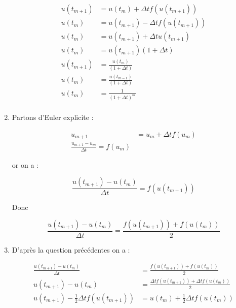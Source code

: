\documentclass[12pt, letterpaper]{article}
\begin{document}
\begin{enumerate}
  \begin{equation*}
    \begin{split}
      u(t_{m+1}) & = u(t_m) + \Delta t f(u(t_{m+1})) \\
      u(t_m) & = u(t_{m+1}) - \Delta t f(u(t_{m+1})) \\
      u(t_m) & = u(t_{m+1}) + \Delta t u(t_{m+1}) \\
      u(t_m) & = u(t_{m+1}) (1 + \Delta t) \\
      u(t_{m+1}) & = \frac{u(t_m)}{(1 + \Delta t)} \\
      u(t_m) & = \frac{u(t_{m-1})}{(1 + \Delta t)} \\
      u(t_m) & = \frac{1}{(1 + \Delta t)^m} \\
    \end{split}
  \end{equation*}


\item
  Partons d'Euler explicite :

  \begin{equation*}
    \begin{split}
      u_{m+1} & = u_m + \Delta t f(u_m) \\
      \frac{u_{m+1} - u_m}{\Delta t} = f(u_m)
    \end{split}
  \end{equation*}

  or on a :

  \begin{equation*}
    \frac{u(t_{m + 1}) - u(t_m)}{\Delta t} = f(u(t_{m+1}))
  \end{equation*}

  Donc

  \begin{equation*}
    \frac{u(t_{m + 1}) - u(t_m)}{\Delta t} = \frac{f(u(t_{m+1})) + f(u(t_m))}{2}
  \end{equation*}

    
\item

  D'après la question précédentes on a :

  \begin{equation*}
    \begin{split}
      \frac{u(t_{m + 1}) - u(t_m)}{\Delta t} & = \frac{f(u(t_{m+1})) +
        f(u(t_m))}{2} \\
      u(t_{m + 1}) - u(t_m) & = \frac{\Delta t f(u(t_{m+1})) +
        \Delta t f(u(t_m))}{2} \\
      u(t_{m + 1}) - \frac{1}{2} \Delta t f(u(t_{m+1})) & = u(t_m) +
      \frac{1}{2} \Delta t f(u(t_m)) \\
    \end{split}
  \end{equation*}


\end{enumerate}
\end{document}
